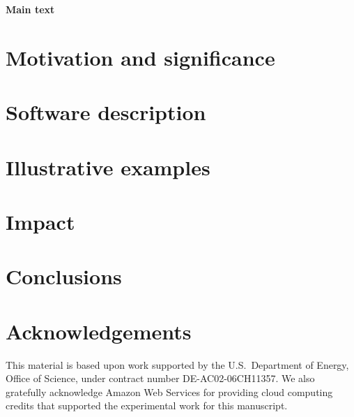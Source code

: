 \documentclass[preprint,12pt, a4paper]{elsarticle}
\begin{document}
\textbf{Main text}\\

\section{Motivation and significance}
\label{sec:motivation}


\section{Software description}
\label{sec:software}


\section{Illustrative examples}
\label{sec:illustrative}


\section{Impact}
\label{sec:impact}


\section{Conclusions}
\label{sec:conclusion}




\section*{Acknowledgements}
\label{}
This material is based upon work supported by the U.S.\ Department of Energy, Office of Science, under contract number DE-AC02-06CH11357. We also gratefully acknowledge Amazon Web Services for providing cloud computing credits that supported the experimental work for this manuscript.



\end{document}
